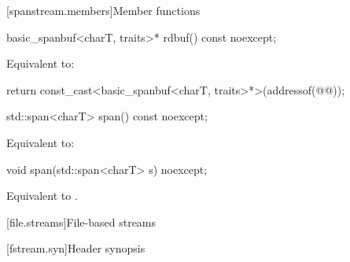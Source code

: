 [spanstream.members]{Member functions}

%
\begin{itemdecl}
basic_spanbuf<charT, traits>* rdbuf() const noexcept;
\end{itemdecl}

\begin{itemdescr}
\pnum
\effects
Equivalent to:
\begin{codeblock}
return const_cast<basic_spanbuf<charT, traits>*>(addressof(@@));
\end{codeblock}
\end{itemdescr}

%
\begin{itemdecl}
std::span<charT> span() const noexcept;
\end{itemdecl}

\begin{itemdescr}
\pnum
\effects
Equivalent to: 
\end{itemdescr}

%
\begin{itemdecl}
void span(std::span<charT> s) noexcept;
\end{itemdecl}

\begin{itemdescr}
\pnum
\effects
Equivalent to .
\end{itemdescr}

[file.streams]{File-based streams}

[fstream.syn]{Header  synopsis}

